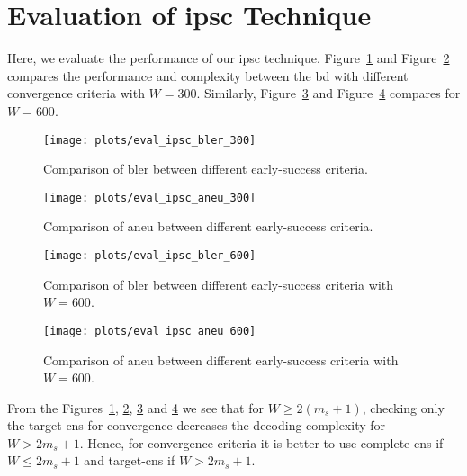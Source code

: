 \section{Evaluation of \acrlong{ipsc} Technique}
Here, we evaluate the performance of our \gls{ipsc} technique. Figure~\ref{fig:eval_ipsc_bler_300} and Figure~\ref{fig:eval_ipsc_aneu_300} compares the performance and complexity between the \gls{bd} with different convergence criteria with $W=300$. Similarly, Figure~\ref{fig:eval_ipsc_bler_600} and Figure~\ref{fig:eval_ipsc_aneu_600} compares for $W=600$.
\begin{figure}[htbp]
  \centering
  \texttt{[image: plots/eval\_ipsc\_bler\_300]}
  \caption{Comparison of \gls{bler} between different early-success criteria.}
  \label{fig:eval_ipsc_bler_300}
\end{figure}
\begin{figure}[htbp]
  \centering
  \texttt{[image: plots/eval\_ipsc\_aneu\_300]}
  \caption{Comparison of \gls{aneu} between different early-success criteria.}
  \label{fig:eval_ipsc_aneu_300}
\end{figure}
\begin{figure}[htbp]
  \centering
  \texttt{[image: plots/eval\_ipsc\_bler\_600]}
  \caption{Comparison of \gls{bler} between different early-success criteria with $W=600$.}
  \label{fig:eval_ipsc_bler_600}
\end{figure}
\begin{figure}[htbp]
  \centering
  \texttt{[image: plots/eval\_ipsc\_aneu\_600]}
  \caption{Comparison of \gls{aneu} between different early-success criteria with $W=600$.}
  \label{fig:eval_ipsc_aneu_600}
\end{figure}

From the Figures~\ref{fig:eval_ipsc_bler_300}, \ref{fig:eval_ipsc_aneu_300}, \ref{fig:eval_ipsc_bler_600} and \ref{fig:eval_ipsc_aneu_600} we see that for $W\geq2(m_s+1)$, checking only the target \glspl{cn} for convergence decreases the decoding complexity for $W>2m_s+1$. Hence, for convergence criteria it is better to use complete-\glspl{cn} if $W\leq2m_s+1$ and target-\glspl{cn} if $W>2m_s+1$.